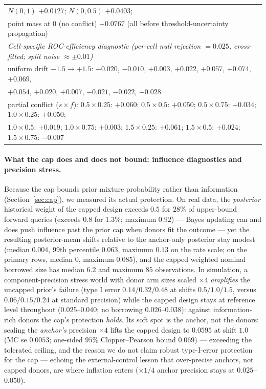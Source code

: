 \documentclass[11pt]{article}
\begin{document}
\begin{table}[htbp]
\begin{tabular}{lcccc}
{$N(0,1)$ $+0.0127$; $N(0,0.5)$ $+0.0403$;}\\
\multicolumn{5}{l}{\quad point mass at $0$ (no conflict) $+0.0767$
\quad (all before threshold-uncertainty propagation)}\\
\hline
\multicolumn{5}{l}{\emph{Cell-specific ROC-efficiency diagnostic
(per-cell null rejection $=0.025$, cross-fitted; split noise
$\approx\pm0.01$)}}\\
\multicolumn{5}{l}{uniform drift $-1.5\to+1.5$: $-0.020$, $-0.010$,
$+0.003$, $+0.022$, $+0.057$, $+0.074$, $+0.069$,}\\
\multicolumn{5}{l}{\quad $+0.054$, $+0.020$, $+0.007$, $-0.021$,
$-0.022$, $-0.028$}\\
\multicolumn{5}{l}{partial conflict ($s \times f$): $0.5{\times}0.25$:
$+0.060$; $0.5{\times}0.5$: $+0.050$; $0.5{\times}0.75$: $+0.034$;
$1.0{\times}0.25$: $+0.050$;}\\
\multicolumn{5}{l}{\quad $1.0{\times}0.5$: $+0.019$; $1.0{\times}0.75$:
$+0.003$; $1.5{\times}0.25$: $+0.061$; $1.5{\times}0.5$: $+0.024$;
$1.5{\times}0.75$: $-0.007$}\\
\hline
\end{tabular}
\end{table}

\paragraph{What the cap does and does not bound: influence diagnostics and
precision stress.} Because the cap bounds prior mixture probability rather
than information (Section~\ref{sec:cap}), we measured its actual
protection. On real data, the \emph{posterior} historical weight of the
capped design exceeds $0.5$ for $28\%$ of upper-bound forward queries
(exceeds $0.8$ for $1.3\%$; maximum $0.92$) --- Bayes updating can and
does push influence past the prior cap when donors fit the outcome ---
yet the resulting posterior-mean shifts relative to the anchor-only
posterior stay modest (median $0.004$, $99$th percentile $0.063$, maximum
$0.13$ on the rate scale; on the primary rows, median $0$, maximum
$0.085$), and the capped weighted nominal borrowed size has median $6.2$
and maximum $85$ observations. In simulation, a component-precision
stress world with donor arm sizes scaled $\times 4$ \emph{amplifies} the
uncapped prior's failure (type I error $0.14/0.32/0.48$ at shifts
$0.5/1.0/1.5$, versus $0.06/0.15/0.24$ at standard precision) while the
capped design stays at reference level throughout
($0.025$--$0.040$; no borrowing $0.026$--$0.038$): against
information-rich donors the cap's protection \emph{holds}. Its soft spot
is the anchor, not the donors: scaling the \emph{anchor's} precision
$\times 4$ lifts the capped design to $0.0595$ at shift $1.0$ (MC se
$0.0053$; one-sided $95\%$ Clopper--Pearson bound $0.069$) --- exceeding
the tolerated ceiling, and the reason we do not claim robust
type-I-error protection for the cap --- echoing the external-control
lesson that over-precise anchors, not capped donors, are where inflation
enters ($\times 1/4$ anchor precision stays at $0.025$--$0.050$).
\end{document}
